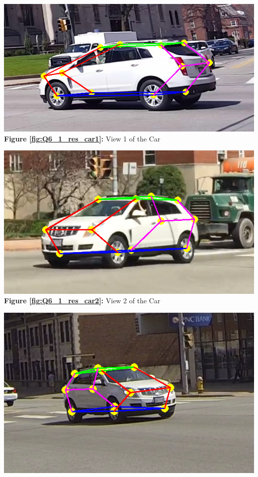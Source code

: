 \begin{your_solution}[title=Q6.1,height=21.5cm,width=\linewidth]
\begin{minipage}[b]{0.32\textwidth}
	\centering
	\includegraphics[width=\textwidth]{../Q6_1_res_car1.png}
	\textbf{Figure \ref{fig:Q6_1_res_car1}:} View 1 of the Car
	\label{fig:Q6_1_res_car1}         %
\end{minipage}
\begin{minipage}[b]{0.32\textwidth}
	\centering
	\includegraphics[width=\textwidth]{../Q6_1_res_car2.png}
	\textbf{Figure \ref{fig:Q6_1_res_car2}:} View 2 of the Car
	\label{fig:Q6_1_res_car2}  
\end{minipage}
\begin{minipage}[b]{0.32\textwidth}
	\centering
	\includegraphics[width=\textwidth]{../Q6_1_res_car3.png}

\end{minipage}
\end{your_solution}
